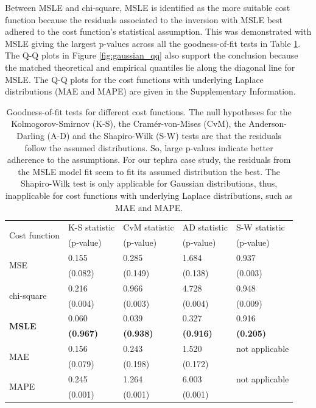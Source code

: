 Between MSLE and chi-square, MSLE is identified as the more suitable cost function because the residuals associated to the inversion with MSLE best adhered to the cost function's statistical assumption. This was demonstrated with MSLE giving the largest p-values across all the goodness-of-fit tests in Table \ref{tab:GOF_loss}. The Q-Q plots in Figure \ref{fig:gaussian_qq} also support the conclusion because the matched theoretical and empirical quantiles lie along the diagonal line for MSLE. The Q-Q plots for the cost functions with underlying Laplace distributions (MAE and MAPE) are given in the Supplementary Information.

    \begin{table}[tbp]
    \centering
    \caption{Goodness-of-fit tests for different cost functions. The null hypotheses for the Kolmogorov-Smirnov (K-S), the Cram{\'e}r-von-Mises (CvM), the Anderson-Darling (A-D) and the Shapiro-Wilk (S-W) tests are that the residuals follow the assumed distributions. So, large p-values indicate better adherence to the assumptions. For our tephra case study, the residuals from the MSLE model fit seem to fit its assumed distribution the best. The Shapiro-Wilk test is only applicable for Gaussian distributions, thus, inapplicable for cost functions with underlying Laplace distributions, such as MAE and MAPE.}
    \begin{tabular}{lllll}
    \hline
    \multirow{2}{*}{Cost function} &  K-S statistic & CvM statistic & AD statistic & S-W statistic \\
    & (p-value) & (p-value) & (p-value) & (p-value) \\
    \hline
    \multirow{2}{*}{MSE}  & 0.155 & 0.285 & 1.684	& 0.937 \\
     & (0.082) & (0.149) & (0.138) & (0.003) \\
    \hline
    \multirow{2}{*}{chi-square}    & 0.216 & 0.966 & 4.728 & 0.948 \\
     & (0.004) & (0.003) & (0.004) & (0.009) \\
    \hline
    \multirow{2}{*}{\textbf{MSLE}}  & 0.060 & 0.039 & 0.327 & 0.916 \\
    & \textbf{(0.967)} & \textbf{(0.938)} & \textbf{(0.916)} & \textbf{(0.205)} \\
    \hline
    \multirow{2}{*}{MAE}  &   0.156 & 0.243 & 1.520 & not applicable \\
     & (0.079) & (0.198) & (0.172) &  \\   
    \hline
    \multirow{2}{*}{MAPE}  & 0.245 & 1.264 & 6.003 & not applicable \\
    & (0.001) & (0.001) & (0.001) &  \\ 
    \hline
    \end{tabular}
    \vspace{2mm}
    \label{tab:GOF_loss}
    \end{table}

